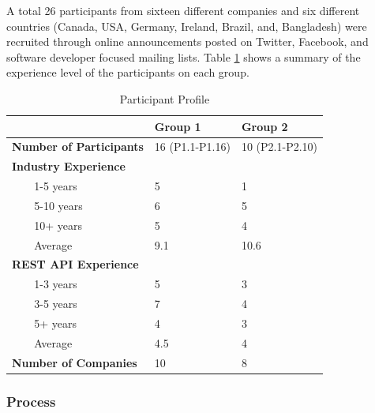 \documentclass[conference]{IEEEtran}
\begin{document}
A total 26 participants from sixteen different companies and six different countries (Canada, USA, Germany, Ireland, Brazil, and,
Bangladesh) were recruited through online announcements posted on Twitter, Facebook, and software developer focused mailing lists. Table \ref{table:participants} shows a summary of the experience level of the participants on each group.

\begin{table}[!tbh]
  \caption{Participant Profile}
  \label{table:participants}

\begin{tabular}{|p{0.8in} p{.6in} p{0.7in} p{0.7in}|}

\hline
& & \textbf{Group 1} & \textbf{Group 2}\\
\hline
\multicolumn{2}{|l}{\textbf{Number of Participants}} & 16 (P1.1-P1.16) & 10 (P2.1-P2.10) \\
\hline
\multicolumn{4}{|l|}{\textbf{Industry Experience}} \\
& 1-5 years & 5 & 1 \\
& 5-10 years & 6 & 5 \\
& 10+ years & 5 & 4 \\
& Average & 9.1 & 10.6 \\
\hline

\multicolumn{4}{|l|}{\textbf{REST API Experience}} \\
&   1-3 years & 5 & 3 \\
&   3-5 years & 7 & 4 \\
&   5+ years & 4 & 3 \\
&   Average & 4.5 & 4 \\

\hline
\multicolumn{2}{|l}{\textbf{Number of Companies}} & 10 & 8 \\
\hline
\end{tabular}

\end{table}


\subsubsection{Process}
\end{document}

